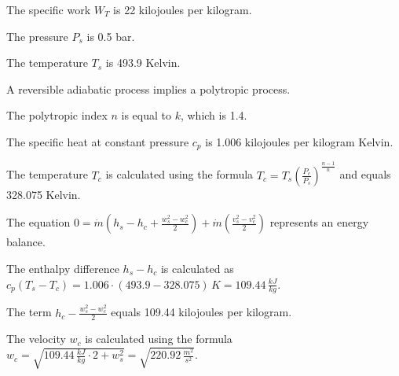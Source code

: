 The specific work \( W_T \) is 22 kilojoules per kilogram.

The pressure \( P_s \) is 0.5 bar.

The temperature \( T_s \) is 493.9 Kelvin.

A reversible adiabatic process implies a polytropic process.

The polytropic index \( n \) is equal to \( k \), which is 1.4.

The specific heat at constant pressure \( c_p \) is 1.006 kilojoules per kilogram Kelvin.

The temperature \( T_c \) is calculated using the formula \( T_c = T_s \left( \frac{P_c}{P_s} \right)^{\frac{n-1}{n}} \) and equals 328.075 Kelvin.

The equation \( 0 = \dot{m} \left( h_s - h_c + \frac{w_s^2 - w_c^2}{2} \right) + \dot{m} \left( \frac{v_s^2 - v_c^2}{2} \right) \) represents an energy balance.

The enthalpy difference \( h_s - h_c \) is calculated as \( c_p (T_s - T_c) = 1.006 \cdot (493.9 - 328.075) \, K = 109.44 \, \frac{kJ}{kg} \).

The term \( h_c - \frac{w_s^2 - w_c^2}{2} \) equals 109.44 kilojoules per kilogram.

The velocity \( w_c \) is calculated using the formula \( w_c = \sqrt{109.44 \, \frac{kJ}{kg} \cdot 2 + w_s^2} = \sqrt{220.92 \, \frac{m^2}{s^2}} \).